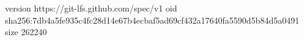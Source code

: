 version https://git-lfs.github.com/spec/v1
oid sha256:7db4a5fe935c4fc28d14e67b4ecbaf5ad69cf432a17640fa5590d5b84d5a0491
size 262240
